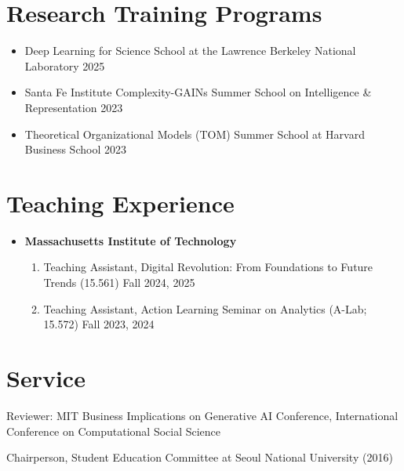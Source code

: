 \documentclass[11pt,a4paper,roman]{moderncv}        %
\begin{document}
\section{Research Training Programs}
\begin{itemize}
    \item Deep Learning for Science School at the Lawrence Berkeley National Laboratory \hfill 2025
    \item Santa Fe Institute Complexity-GAINs Summer School on Intelligence \& Representation \hfill 2023
    \item Theoretical Organizational Models (TOM) Summer School at Harvard Business School \hfill 2023
\end{itemize}



\newpage
\section{Teaching Experience}

\begin{itemize}
    \item \textbf{Massachusetts Institute of Technology}
    \vspace{0.1em} %
    \small{
	\begin{enumerate}
        \item Teaching Assistant, Digital Revolution: From Foundations to Future Trends (15.561) \hfill Fall 2024, 2025
	  \item Teaching Assistant, Action Learning Seminar on Analytics (A-Lab; 15.572) \hfill Fall 2023, 2024
	\end{enumerate}}%
\end{itemize}

\section{Service}

\begin{itemize}
    \small{
    \item Reviewer: MIT Business Implications on Generative AI Conference, International Conference on Computational Social Science
    \item Chairperson, Student Education Committee at Seoul National University (2016)
    }
    
\end{itemize}
\end{document}
